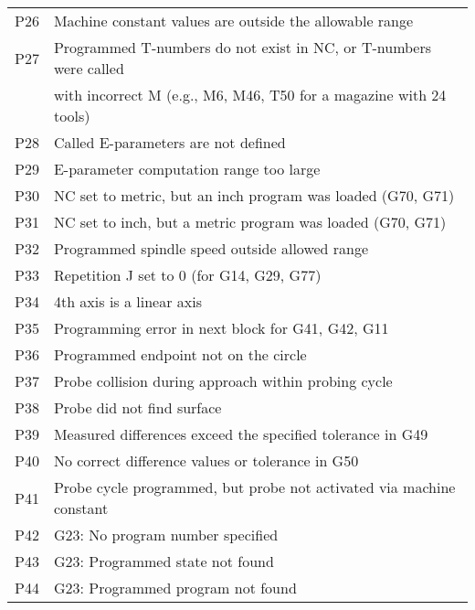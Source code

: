 \documentclass[openany,11pt]{book}
\begin{document}
\begin{table}[!h]
\begin{tabular}{ll}
    P26 & Machine constant values are outside the allowable range \\
    P27 & Programmed T-numbers do not exist in NC, or T-numbers were called \\
        & with incorrect M (e.g., M6, M46, T50 for a magazine with 24 tools) \\
    P28 & Called E-parameters are not defined \\
    P29 & E-parameter computation range too large \\
    P30 & NC set to metric, but an inch program was loaded (G70, G71) \\
    P31 & NC set to inch, but a metric program was loaded (G70, G71) \\
    P32 & Programmed spindle speed outside allowed range \\
    P33 & Repetition J set to 0 (for G14, G29, G77) \\
    P34 & 4th axis is a linear axis \\
    P35 & Programming error in next block for G41, G42, G11 \\
    P36 & Programmed endpoint not on the circle \\
    P37 & Probe collision during approach within probing cycle \\
    P38 & Probe did not find surface \\
    P39 & Measured differences exceed the specified tolerance in G49 \\
    P40 & No correct difference values or tolerance in G50 \\
    P41 & Probe cycle programmed, but probe not activated via machine constant \\
    P42 & G23: No program number specified \\
    P43 & G23: Programmed state not found \\
    P44 & G23: Programmed program not found \\
    \end{tabular}
\end{table}
\end{document}
